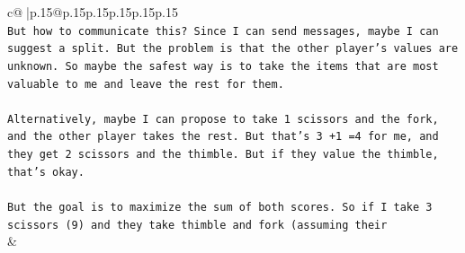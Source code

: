 \documentclass{article}
\begin{document}
{\begin{supertabular}{c@{$\;$}|p{.15\linewidth}@{}p{.15\linewidth}p{.15\linewidth}p{.15\linewidth}p{.15\linewidth}p{.15\linewidth}}
{{{\\ 
\texttt{But how to communicate this? Since I can send messages, maybe I can suggest a split. But the problem is that the other player's values are unknown. So maybe the safest way is to take the items that are most valuable to me and leave the rest for them. } \\
\\ 
\texttt{Alternatively, maybe I can propose to take 1 scissors and the fork, and the other player takes the rest. But that's 3 +1 =4 for me, and they get 2 scissors and the thimble. But if they value the thimble, that's okay. } \\
\\ 
\texttt{But the goal is to maximize the sum of both scores. So if I take 3 scissors (9) and they take thimble and fork (assuming their} \\
            }
        }
    }
    & \\ \\


\end{supertabular}}
\end{document}
